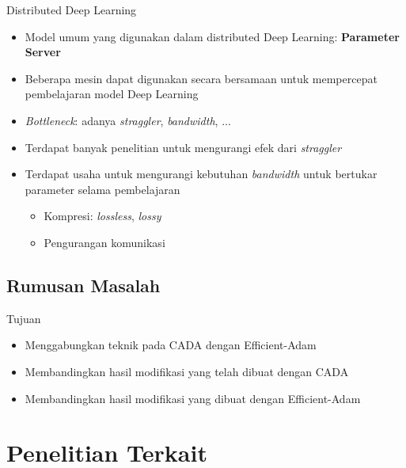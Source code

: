 \documentclass[aspectratio=169]{beamer}
\begin{document}
\begin{frame}{Distributed Deep Learning}
  \begin{itemize}
    \item Model umum yang digunakan dalam distributed Deep Learning: \textbf{Parameter Server}
    \item Beberapa mesin dapat digunakan secara bersamaan untuk mempercepat pembelajaran model Deep Learning
    \item \textit{Bottleneck}: adanya \textit{straggler}, \textit{bandwidth}, ...
    \item Terdapat banyak penelitian untuk mengurangi efek dari \textit{straggler}
    \item Terdapat usaha untuk mengurangi kebutuhan \textit{bandwidth} untuk bertukar parameter selama pembelajaran
          \begin{itemize}
            \item Kompresi: \textit{lossless}, \textit{lossy}
            \item Pengurangan komunikasi
          \end{itemize}
  \end{itemize}
\end{frame}

\subsection{Rumusan Masalah}
\begin{frame}{Tujuan}
  \begin{itemize}
    \item Menggabungkan teknik pada CADA dengan Efficient-Adam
    \item Membandingkan hasil modifikasi yang telah dibuat dengan CADA
    \item Membandingkan hasil modifikasi yang dibuat dengan Efficient-Adam
  \end{itemize}
\end{frame}

\section{Penelitian Terkait}
\end{document}
